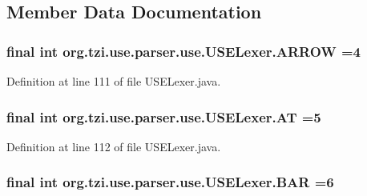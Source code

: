 \subsection{Member Data Documentation}
\hypertarget{classorg_1_1tzi_1_1use_1_1parser_1_1use_1_1_u_s_e_lexer_a90e38e7133314f444bc2383365c0f453}{
\subsubsection[{A\-R\-R\-O\-W}]{\setlength{\rightskip}{0pt plus 5cm}final int org.\-tzi.\-use.\-parser.\-use.\-U\-S\-E\-Lexer.\-A\-R\-R\-O\-W =4\hspace{0.3cm}{\ttfamily [static]}}}\label{classorg_1_1tzi_1_1use_1_1parser_1_1use_1_1_u_s_e_lexer_a90e38e7133314f444bc2383365c0f453}


Definition at line 111 of file U\-S\-E\-Lexer.\-java.

\hypertarget{classorg_1_1tzi_1_1use_1_1parser_1_1use_1_1_u_s_e_lexer_adbdd2d9f5831fdca0edda1d80a39821b}{
\subsubsection[{A\-T}]{\setlength{\rightskip}{0pt plus 5cm}final int org.\-tzi.\-use.\-parser.\-use.\-U\-S\-E\-Lexer.\-A\-T =5\hspace{0.3cm}{\ttfamily [static]}}}\label{classorg_1_1tzi_1_1use_1_1parser_1_1use_1_1_u_s_e_lexer_adbdd2d9f5831fdca0edda1d80a39821b}


Definition at line 112 of file U\-S\-E\-Lexer.\-java.

\hypertarget{classorg_1_1tzi_1_1use_1_1parser_1_1use_1_1_u_s_e_lexer_ac0492c84a8773ecf77bb6a0037a483b9}{
\subsubsection[{B\-A\-R}]{\setlength{\rightskip}{0pt plus 5cm}final int org.\-tzi.\-use.\-parser.\-use.\-U\-S\-E\-Lexer.\-B\-A\-R =6\hspace{0.3cm}{\ttfamily [static]}}}\label{classorg_1_1tzi_1_1use_1_1parser_1_1use_1_1_u_s_e_lexer_ac0492c84a8773ecf77bb6a0037a483b9}


